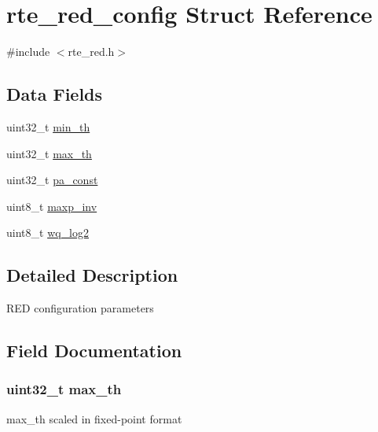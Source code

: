 \hypertarget{structrte__red__config}{}\section{rte\+\_\+red\+\_\+config Struct Reference}
\label{structrte__red__config}


{\ttfamily \#include $<$rte\+\_\+red.\+h$>$}

\subsection*{Data Fields}
\begin{DoxyCompactItemize}
\item 
uint32\+\_\+t \hyperlink{structrte__red__config_a34a00988a15f859e28d685331d6b33bc}{min\+\_\+th}
\item 
uint32\+\_\+t \hyperlink{structrte__red__config_af5ef59c24a37566d24833b854c5f54fc}{max\+\_\+th}
\item 
uint32\+\_\+t \hyperlink{structrte__red__config_a00a8a586c47354f82da115ac241ca013}{pa\+\_\+const}
\item 
uint8\+\_\+t \hyperlink{structrte__red__config_a2b8cd8fd103afdd931eac30db9d5c560}{maxp\+\_\+inv}
\item 
uint8\+\_\+t \hyperlink{structrte__red__config_a23f07bc6f30cea0b2d93a91578b528c5}{wq\+\_\+log2}
\end{DoxyCompactItemize}


\subsection{Detailed Description}
R\+E\+D configuration parameters 

\subsection{Field Documentation}
\hypertarget{structrte__red__config_af5ef59c24a37566d24833b854c5f54fc}{}
\subsubsection[{max\+\_\+th}]{\setlength{\rightskip}{0pt plus 5cm}uint32\+\_\+t max\+\_\+th}\label{structrte__red__config_af5ef59c24a37566d24833b854c5f54fc}
max\+\_\+th scaled in fixed-\/point format \hypertarget{structrte__red__config_a2b8cd8fd103afdd931eac30db9d5c560}{}

